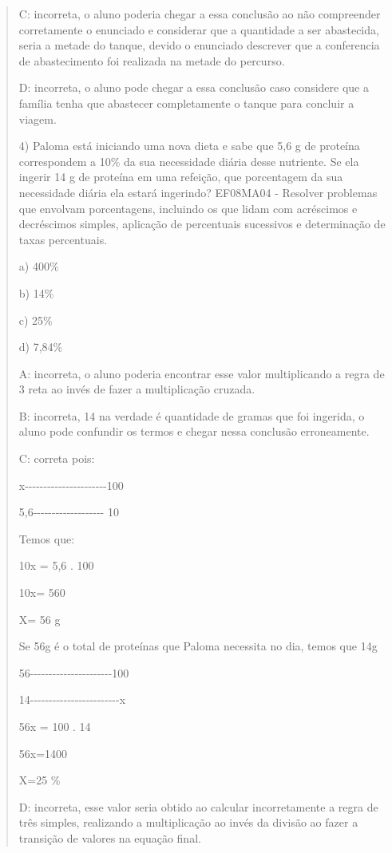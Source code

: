 \begin{quote}
\begin{escolha}
C: incorreta, o aluno poderia chegar a essa conclusão ao não compreender
corretamente o enunciado e considerar que a quantidade a ser abastecida,
seria a metade do tanque, devido o enunciado descrever que a conferencia
de abastecimento foi realizada na metade do percurso.

D: incorreta, o aluno pode chegar a essa conclusão caso considere que a
família tenha que abastecer completamente o tanque para concluir a
viagem.

4) Paloma está iniciando uma nova dieta e sabe que 5,6 g de proteína
correspondem a 10\% da sua necessidade diária desse nutriente. Se ela
ingerir 14 g de proteína em uma refeição, que porcentagem da sua
necessidade diária ela estará ingerindo? EF08MA04 - Resolver problemas
que envolvam porcentagens, incluindo os que lidam com acréscimos e
decréscimos simples, aplicação de percentuais sucessivos e determinação
de taxas percentuais.

a) 400\%

b) 14\%

c) 25\%

d) 7,84\%

A: incorreta, o aluno poderia encontrar esse valor multiplicando a regra
de 3 reta ao invés de fazer a multiplicação cruzada.

B: incorreta, 14 na verdade é quantidade de gramas que foi ingerida, o
aluno pode confundir os termos e chegar nessa conclusão erroneamente.

C: correta pois:

x-\/-\/-\/-\/-\/-\/-\/-\/-\/-\/-\/-\/-\/-\/-\/-\/-\/-\/-\/-\/-\/-100

5,6-\/-\/-\/-\/-\/-\/-\/-\/-\/-\/-\/-\/-\/-\/-\/-\/-\/-\/- 10

Temos que:

10x = 5,6 . 100

10x= 560

X= 56 g

Se 56g é o total de proteínas que Paloma necessita no dia, temos que 14g

56-\/-\/-\/-\/-\/-\/-\/-\/-\/-\/-\/-\/-\/-\/-\/-\/-\/-\/-\/-\/-\/-100

14-\/-\/-\/-\/-\/-\/-\/-\/-\/-\/-\/-\/-\/-\/-\/-\/-\/-\/-\/-\/-\/-\/-\/-x

56x = 100 . 14

56x=1400

X=25 \%

D: incorreta, esse valor seria obtido ao calcular incorretamente a regra
de três simples, realizando a multiplicação ao invés da divisão ao fazer
a transição de valores na equação final.


\end{escolha}
\end{quote}
